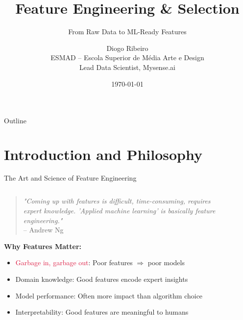 \documentclass[aspectratio=169,11pt]{beamer}
\title[Feature Engineering]{Feature Engineering \& Selection}
\subtitle{From Raw Data to ML-Ready Features}
\author[D. Ribeiro]{Diogo Ribeiro\\
\small ESMAD -- Escola Superior de Média Arte e Design\\
\small Lead Data Scientist, Mysense.ai}
\date{\today}
\begin{document}
\begin{frame}
\titlepage
\end{frame}

\begin{frame}{Outline}
\tableofcontents
\end{frame}

\section{Introduction and Philosophy}

\begin{frame}{The Art and Science of Feature Engineering}
\begin{columns}
\begin{column}{0.6\textwidth}
\begin{quote}
\textit{"Coming up with features is difficult, time-consuming, requires expert knowledge. 'Applied machine learning' is basically feature engineering."} 
\\[0.2cm]
\hfill -- Andrew Ng
\end{quote}

\vspace{0.3cm}
\textbf{Why Features Matter:}
\begin{itemize}
\item \textcolor{crimson}{Garbage in, garbage out}: Poor features $\Rightarrow$ poor models
\item \textcolor{forest}{Domain knowledge}: Good features encode expert insights
\item \textcolor{forest}{Model performance}: Often more impact than algorithm choice
\item \textcolor{forest}{Interpretability}: Good features are meaningful to humans
\end{itemize}
\end{column}
\begin{column}{0.4\textwidth}
\begin{figure}
\centering
{}
\end{figure}
\end{column}
\end{columns}
\end{frame}
\end{document}
